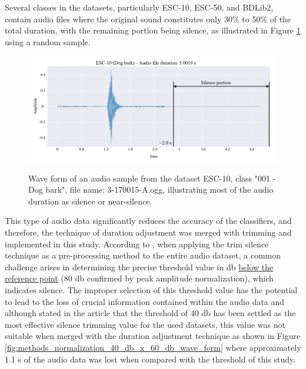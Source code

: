Several classes in the datasets, particularly ESC-10, ESC-50, and BDLib2, contain audio files where the original sound constitutes only 30\% to 50\% of the total duration, with the remaining portion being silence, as illustrated in Figure \ref{fig:methods_normalization_original_wave_form} using a random sample.

\begin{figure}[htbp]
    \raggedright
        \caption{Wave form of an audio sample from the dataset ESC-10, class "001 - Dog bark", file name: 3-170015-A.ogg, illustrating most of the audio duration as silence or near-silence.}
        \includegraphics[width=1\textwidth]{resources/images/050-methods/Methods_normalization_original.png}
        \label{fig:methods_normalization_original_wave_form}
\end{figure}

This type of audio data significantly reduces the accuracy of the classifiers, and therefore, the technique of duration adjustment was merged with trimming and implemented in this study. According to \textcite{Mmushtaq2020}, when applying the trim silence technique as a pre-processing method to the entire audio dataset, a common challenge arises in determining the precise threshold value in \gls{db} \underline{below the reference point} (80 \gls{db} confirmed by peak amplitude normalization), which indicates silence. The improper selection of this threshold value has the potential to lead to the loss of crucial information contained within the audio data and although stated in the article that the threshold of 40 \gls{db} has been settled as the most effective silence trimming value for the used datasets, this value was not suitable when merged with the duration adjustment technique as shown in Figure \ref{fig:methods_normalization_40_db_x_60_db_wave_form} where approximately 1.1 \gls{s} of the audio data was lost when compared with the threshold of this study.

